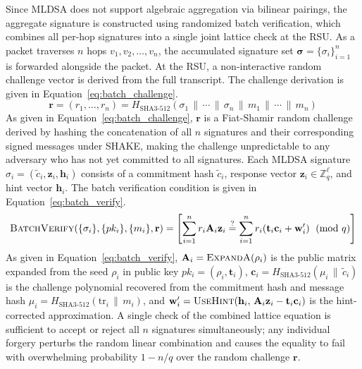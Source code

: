 \documentclass[12pt, a4paper]{report}
\begin{document}
Since \ac{MLDSA} does not support algebraic aggregation
via bilinear pairings, the aggregate signature is
constructed using randomized batch verification, which
combines all per-hop signatures into a single joint
lattice check at the \ac{RSU}. As a packet traverses
$n$ hops $v_1, v_2, \ldots, v_n$, the accumulated
signature set $\boldsymbol{\sigma} =
\{\sigma_i\}_{i=1}^n$ is forwarded alongside the packet.
At the \ac{RSU}, a non-interactive random challenge
vector is derived from the full transcript. The challenge
derivation is given in Equation~\eqref{eq:batch_challenge}.
\begin{equation}
\mathbf{r} = (r_1, \ldots, r_n) =
H_{\text{SHA3-512}}\!\left(
\sigma_1 \,\|\, \cdots \,\|\, \sigma_n \,\|\,
m_1 \,\|\, \cdots \,\|\, m_n
\right)
\label{eq:batch_challenge}
\end{equation}
As given in Equation~\eqref{eq:batch_challenge},
$\mathbf{r}$ is a Fiat-Shamir random challenge derived
by hashing the concatenation of all $n$ signatures and
their corresponding signed messages under \ac{SHAKE},
making the challenge unpredictable to any adversary who
has not yet committed to all signatures. Each \ac{MLDSA}
signature $\sigma_i = (\tilde{c}_i, \mathbf{z}_i,
\mathbf{h}_i)$ consists of a commitment hash
$\tilde{c}_i$, response vector $\mathbf{z}_i \in
\mathbb{Z}_q^\ell$, and hint vector $\mathbf{h}_i$.
The batch verification condition is given in
Equation~\eqref{eq:batch_verify}.
\begin{equation}
\textsc{BatchVerify}\!\left(
\{\sigma_i\}, \{pk_i\}, \{m_i\}, \mathbf{r}
\right) =
\left[
\sum_{i=1}^{n} r_i \mathbf{A}_i \mathbf{z}_i
\stackrel{?}{=}
\sum_{i=1}^{n} r_i
\!\left(
\mathbf{t}_i \mathbf{c}_i +
\mathbf{w}'_i
\right) \pmod{q}
\right]
\label{eq:batch_verify}
\end{equation}
As given in Equation~\eqref{eq:batch_verify},
$\mathbf{A}_i = \textsc{ExpandA}(\rho_i)$ is the public
matrix expanded from the seed $\rho_i$ in public key
$pk_i = (\rho_i, \mathbf{t}_i)$, $\mathbf{c}_i =
H_{\text{SHA3-512}}(\mu_i \,\|\, \tilde{c}_i)$ is the
challenge polynomial recovered from the commitment hash
and message hash $\mu_i = H_{\text{SHA3-512}}
(\text{tr}_i \,\|\, m_i)$, and $\mathbf{w}'_i =
\textsc{UseHint}(\mathbf{h}_i,\,
\mathbf{A}_i \mathbf{z}_i - \mathbf{t}_i \mathbf{c}_i)$
is the hint-corrected approximation. A single check of
the combined lattice equation is sufficient to accept
or reject all $n$ signatures simultaneously; any
individual forgery perturbs the random linear combination
and causes the equality to fail with overwhelming
probability $1 - n/q$ over the random challenge $\mathbf{r}$.
\end{document}
